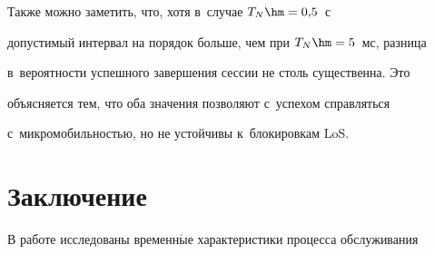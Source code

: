 \begin{figure}














\vspace*{-15pt}


\begin{minipage}[t]{63mm}




\end{minipage}




  \end{figure}


Также мож\-но заметить, что, хотя в~случае $T_N\hm=0{,}5$~с 


допустимый интервал на порядок больше, чем при $T_N\hm= 5$~мс, разница 


в~ве\-ро\-ят\-ности успешного завершения сессии не столь существенна. Это 


объясняется тем, что оба значения позволяют с~успехом справ\-лять\-ся 


с~мик\-ро\-мо\-биль\-ностью, но не устойчивы к~блокировкам LoS.





  \renewcommand{\figurename}{\protect\bf Рис.}


\renewcommand{\tablename}{\protect\bf Таблица}





\section{Заключение}


  


  В работе исследованы временн$\acute{\mbox{ы}}$е характеристики процесса обслуживания 


